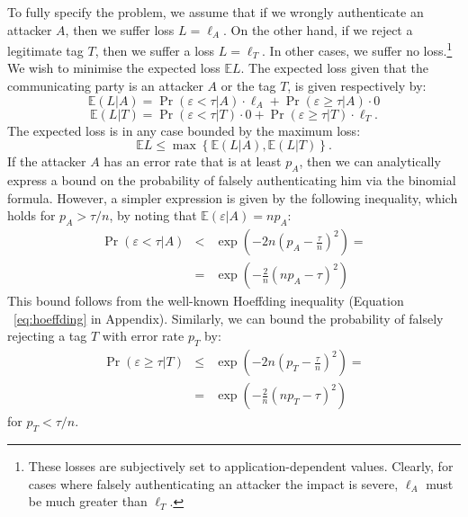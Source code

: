 \documentclass{article}
\newcommand \E {\mathbb{E}}
\newcommand \thr {\tau}
\newcommand \err {\varepsilon}
\newcommand \loss {L}
\newcommand \pa {p_A}
\newcommand \pt {p_T}
\newcommand \LA {\ell_A}
\newcommand \LT {\ell_T}
\begin{document}
To fully specify the problem, we assume that if we wrongly
authenticate an attacker $A$, then we suffer loss $\loss = \LA$. On
the other hand, if we reject a legitimate tag $T$, then we suffer a
loss $\loss = \LT$. In other cases, we suffer no loss.\footnote{These
  losses are subjectively set to application-dependent
  values. Clearly, for cases where falsely authenticating an attacker
  the impact is severe, $\LA$ must be much greater than $\LT$.} We
wish to minimise the expected loss $\E \loss$. The expected loss given
that the communicating party is an attacker $A$ or the tag $T$, is
given respectively by:
\begin{equation}
  \E (\loss | A) =
  \Pr(\err < \thr | A) \cdot \LA
  + \Pr(\err \geq \thr | A) \cdot 0 \nonumber
\end{equation}
\begin{equation}
  \E (\loss | T) =
  \Pr(\err < \thr | T) \cdot 0
  + \Pr(\err \geq \thr | T) \cdot \LT. \nonumber
\end{equation}
The expected loss is in any case bounded by the maximum loss:
\begin{equation}
  \E \loss \leq \max \left\{ \E(\loss | A), \E(\loss | T)\right\}.
  \label{eq:maximum-loss}
\end{equation}
If the attacker $A$ has an error rate that is at least $\pa$, then we can
analytically express a bound on the probability of falsely
authenticating him via the binomial formula. However, a simpler
expression is given by the following inequality, which holds for $\pa >
\thr/n$, by noting that $\E(\err | A) = n \pa$:
\begin{eqnarray*}
  \Pr(\err < \thr | A)
  &<&
  \exp\left(-2n(\pa - \frac{\thr}{n})^2\right)
  = \\
  &=& \exp\left(-\frac{2}{n}(n\pa - \thr)^2\right) \end{eqnarray*}
This bound follows from the well-known Hoeffding inequality (Equation
~\eqref{eq:hoeffding} in Appendix).  Similarly, we can bound the probability of
falsely rejecting a tag $T$ with error rate $\pt$ by:
\begin{eqnarray*}
  \Pr(\err \geq \thr | T)
  &\leq&
  \exp\left(-2n(\pt - \frac{\thr}{n})^2\right)
  =\\
  &=&\exp\left(-\frac{2}{n}(n\pt - \thr)^2\right) \end{eqnarray*}
for $\pt < \thr / n$.
\end{document}
